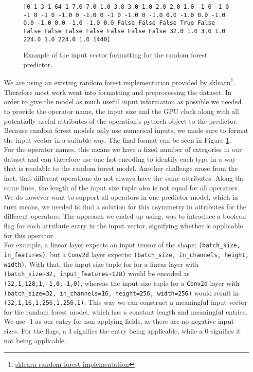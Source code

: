 \begin{figure}
\texttt{[0 1 3 1 64 1 7.0 7.0 1.0 3.0 3.0 1.0 2.0 2.0 1.0 -1 0 -1 0 -1 0 -1 0 -1.0 0 -1.0 0 -1 0 -1.0 0 -1.0 0.0 -1.0 0.0 -1.0 0.0 -1.0 0.0 -1.0 -1.0 0.0 False False False True False False False False False False False False 32.0 1.0 3.0 1.0 224.0 1.0 224.0 1.0 1440]}
\caption{Example of the input vector formatting for the random forest predictor.}
\label{input_vector}
\end{figure}

We are using an existing random forest implementation provided by sklearn\footnote{\href{https://scikit-learn.org/stable/modules/generated/sklearn.ensemble.RandomForestRegressor.html}{sklearn random forest implementation} }. Therefore most work went into formatting and preprocessing the dataset. In order to give the model as much useful input information as possible we needed to provide the operator name, the input size and the GPU clock along with all potentially useful attributes of the operation's pytorch object to the predictor. \\
Because random forest models only use numerical inputs, we made sure to format the input vector in a suitable way. The final format can be seen in Figure \ref{input_vector}.\\
For the operator names, this means we have a fixed number of categories in our dataset and can therefore use one-hot encoding to identify each type in a way that is readable to the random forest model. Another challenge arose from the fact, that different operations do not always have the same attributes. Along the same lines, the length of the input size tuple also is not equal for all operators. We do however want to support all operators in one predictor model, which in turn means, we needed to find a solution for this asymmetry in attributes for the different operators. The approach we ended up using, was to introduce a boolean flag for each attribute entry in the input vector, signifying whether is applicable for this operator.\\
For example, a linear layer expects an input tensor of the shape: \texttt{(batch\_size, in\_features)}, but a \texttt{Conv2d} layer expects: \texttt{(batch\_size, in\_channels, height, width)}. With that, the input size tuple for for a linear layer with \texttt{(batch\_size=32, input\_features=128)} would be encoded as \texttt{(32,1,128,1,-1,0,-1,0)}, whereas the input size tuple for a \texttt{Conv2d} layer with \texttt{(batch\_size=32, in\_channels=16, height=256, width=256)} would result in \texttt{(32,1,16,1,256,1,256,1)}. This way we can construct a meaningful input vector for the random forest model, which has a constant length and meaningful entries. We use -1 as our entry for non applying fields, as there are no negative input sizes. For the flags, a 1 signifies the entry being applicable, while a 0 signifies it not being applicable.\\
